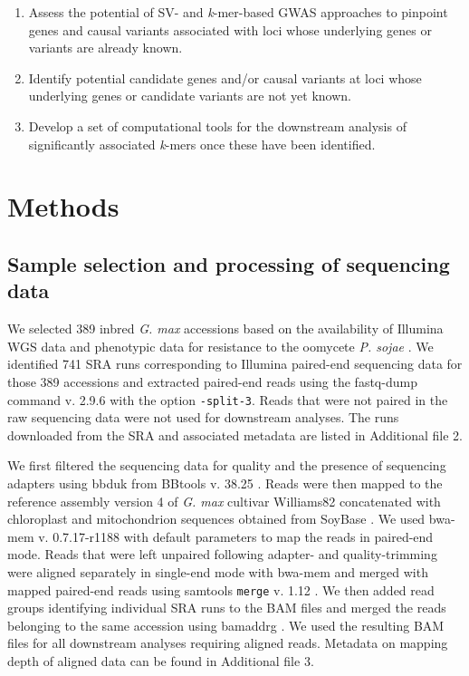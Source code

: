 \documentclass{article}
\begin{document}
\begin{enumerate}
	\item Assess the potential of SV- and \emph{k}-mer-based GWAS approaches to
		pinpoint genes and causal variants associated with loci whose
		underlying genes or variants are already known.
	\item Identify potential candidate genes and/or causal variants at loci
		whose underlying genes or candidate variants are not yet known.
	\item Develop a set of computational tools for the downstream analysis
		of significantly associated \emph{k}-mers once these have been
		identified.
\end{enumerate}

\section*{Methods}

\subsection*{Sample selection and processing of sequencing data}

We selected 389 inbred \emph{G. max} accessions based on the availability of
Illumina WGS data and phenotypic data for resistance to the oomycete \emph{P.
sojae} \citep{deronne2022}.  We identified 741 SRA runs corresponding to
Illumina paired-end sequencing data for those 389 accessions \citep[data from][]{zhou2015, valliyodan2016, fang2017, bayer2021}
and extracted paired-end reads using the fastq-dump command v. 2.9.6
\cite{sratoolkit} with the
option \texttt{-\-split-3}.
Reads that were not paired in the raw sequencing data were not used
for downstream analyses.  The runs downloaded from the SRA and associated
metadata are listed in Additional file 2.

We first filtered the sequencing data for quality and the presence of sequencing
adapters using bbduk from BBtools v. 38.25
\cite{bbtools}. Reads
were then mapped to the reference assembly version 4 of \emph{G. max}
cultivar Williams82 \citep{valliyodan2019} concatenated with chloroplast
and mitochondrion sequences obtained from SoyBase \citep{grant2010}. We used
bwa-mem v. 0.7.17-r1188 \citep{li2009-bwa} with default parameters to map the
reads in paired-end mode. Reads that were left unpaired following adapter- and
quality-trimming were aligned separately in single-end mode with bwa-mem and
merged with mapped paired-end reads using samtools \texttt{merge}
v. 1.12 \citep{li2009-samtools}.  We then added read groups identifying
individual SRA runs to the BAM files and merged the reads belonging to the same
accession using bamaddrg
\cite{bamaddrg}. We used the
resulting BAM files for all downstream analyses requiring aligned reads.
Metadata on mapping depth of aligned data can be found in Additional file 3.
\end{document}
